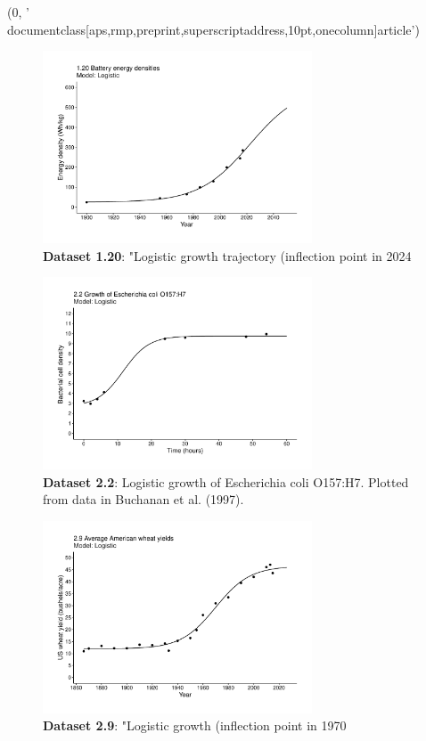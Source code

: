 (0, '\\documentclass[aps,rmp,preprint,superscriptaddress,10pt,onecolumn]{article}\n')
\begin{document}
\begin{figure}[h]
\includegraphics[width=8cm]{output/figs-ggplot/1.20.pdf}
\caption{\textbf{Dataset 1.20}: "Logistic growth trajectory (inflection point in 2024}
\end{figure}
	
\begin{figure}[h]
\includegraphics[width=8cm]{output/figs-ggplot/2.2.pdf}
\caption{\textbf{Dataset 2.2}: Logistic growth of Escherichia coli O157:H7. Plotted from data in Buchanan et al. (1997).}
\end{figure}
	
\begin{figure}[h]
\includegraphics[width=8cm]{output/figs-ggplot/2.9.pdf}
\caption{\textbf{Dataset 2.9}: "Logistic growth (inflection point in 1970}
\end{figure}
	
\end{document}
